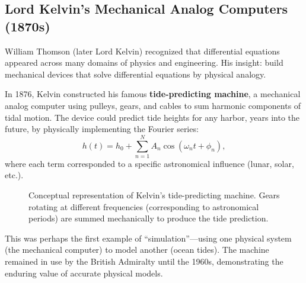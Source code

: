 \subsection{Lord Kelvin's Mechanical Analog Computers (1870s)}

William Thomson (later Lord Kelvin) recognized that differential equations appeared across many domains of physics and engineering. His insight: build mechanical devices that solve differential equations by physical analogy.

In 1876, Kelvin constructed his famous \textbf{tide-predicting machine}, a mechanical analog computer using pulleys, gears, and cables to sum harmonic components of tidal motion. The device could predict tide heights for any harbor, years into the future, by physically implementing the Fourier series:
\begin{equation}
h(t) = h_0 + \sum_{n=1}^{N} A_n \cos(\omega_n t + \phi_n),
\end{equation}
where each term corresponded to a specific astronomical influence (lunar, solar, etc.).

\begin{figure}[htbp]
\centering
{}
\caption{Conceptual representation of Kelvin's tide-predicting machine. Gears rotating at different frequencies (corresponding to astronomical periods) are summed mechanically to produce the tide prediction.}
\label{fig:tide_predictor}
\end{figure}

This was perhaps the first example of ``simulation''---using one physical system (the mechanical computer) to model another (ocean tides). The machine remained in use by the British Admiralty until the 1960s, demonstrating the enduring value of accurate physical models.

